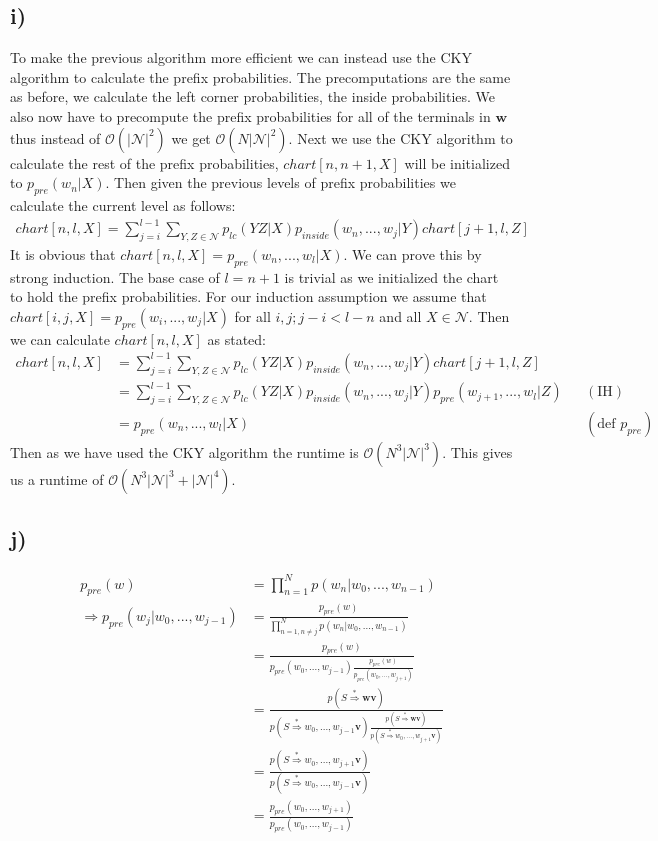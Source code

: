 \documentclass[a4paper,12pt]{ETHexercise}
\begin{document}
\subsection*{i)}
To make the previous algorithm more efficient we can instead use the CKY algorithm to calculate the prefix probabilities. The precomputations are the same as before, we calculate the left corner probabilities, the inside probabilities. We also now have to precompute the prefix probabilities for all of the terminals in $\textbf{w}$ thus instead of $\mathcal{O}(|\mathcal{N}|^2)$ we get $\mathcal{O}(N |\mathcal{N}|^2)$.
Next we use the CKY algorithm to calculate the rest of the prefix probabilities, $chart[n,n+1, X]$ will be initialized to $p_{pre}(w_n|X)$. Then given the previous levels of prefix probabilities we calculate the current level as follows:
\begin{align}
    chart[n, l, X] = \sum_{j=i}^{l-1}\sum_{Y,Z\in\mathcal{N}}p_{lc}(YZ|X)p_{inside}(w_n,...,w_j|Y)chart[j+1,l,Z]
\end{align}
It is obvious that $chart[n, l, X] = p_{pre}(w_n,...,w_l|X)$. We can prove this by strong induction. The base case of $l = n+1$ is trivial as we initialized the chart to hold the prefix probabilities. For our induction assumption we assume that $chart[i, j, X] = p_{pre}(w_i,...,w_j|X)$ for all $i,j; j - i < l - n$ and all $X \in \mathcal{N}$. Then we can calculate $chart[n, l, X]$ as stated:
\begin{align}
    chart[n, l, X] &= \sum_{j=i}^{l-1}\sum_{Y,Z\in\mathcal{N}}p_{lc}(YZ|X)p_{inside}(w_n,...,w_j|Y)chart[j+1,l,Z]\\
    &= \sum_{j=i}^{l-1}\sum_{Y,Z\in\mathcal{N}}p_{lc}(YZ|X)p_{inside}(w_n,...,w_j|Y)p_{pre}(w_{j+1},...,w_l|Z) &&(\text{IH})\\
    &= p_{pre}(w_n,...,w_l|X) &&(\text{def }p_{pre})
\end{align}
Then as we have used the CKY algorithm the runtime is $\mathcal{O}(N^3|\mathcal{N}|^3)$.
This gives us a runtime of $\mathcal{O}(N^3|\mathcal{N}|^3 + |\mathcal{N}|^4)$.

\subsection*{j)}
\begin{align}
    p_{pre}(w) &= \prod_{n=1}^N p(w_n|w_0,...,w_{n-1})\\
    \Rightarrow p_{pre}(w_j|w_0,...,w_{j-1}) &= 
    \frac{p_{pre}(w)}{\prod_{n=1, n \neq j}^N p(w_n|w_0,...,w_{n-1})}\\
    &=\frac{p_{pre}(w)}{p_{pre}(w_0,...,w_{j-1}) \frac{p_{pre}(w)}{p_{pre}(w_0,...,w_{j+1})}}\\
    &= \frac{p(S \stackrel{*}{\Rightarrow} \textbf{wv})}{p(S \stackrel{*}{\Rightarrow} w_0,...,w_{j-1}\textbf{v}) \frac{p(S \stackrel{*}{\Rightarrow} \textbf{wv})}{p(S \stackrel{*}{\Rightarrow} w_0,...,w_{j+1}\textbf{v})}}\\
    &= \frac{p(S \stackrel{*}{\Rightarrow} w_0,...,w_{j+1}\textbf{v})}{p(S \stackrel{*}{\Rightarrow} w_0,...,w_{j-1}\textbf{v})}\\
    &= \frac{p_{pre}(w_0,...,w_{j+1})}{p_{pre}(w_0,...,w_{j-1})}
\end{align}
\end{document}
